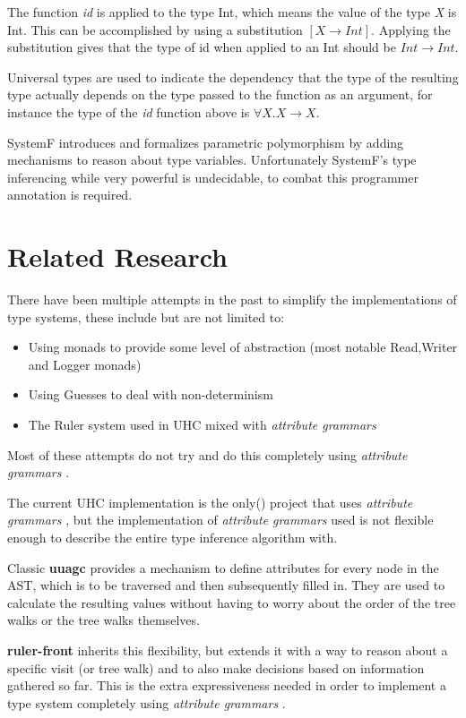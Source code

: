 \documentclass[twoside, titlepage, openright, a4paper]{book}
\newcommand{\ba}[1]{$[#1]$}
\newcommand{\ags}{\emph{attribute grammars }}
\begin{document}
The function \emph{id} is applied to the type Int, which means the value of the type \emph{X} is Int. This can be accomplished by using a substitution \ba{X\rightarrow Int}. Applying the substitution gives that the type of id when applied to an Int should be $Int \rightarrow Int$.

Universal types are used to indicate the dependency that the type of the resulting type actually depends on the type passed to the function as an argument, for instance the type of the \textit{id} function above is $\forall X. X\rightarrow X$.

SystemF introduces and formalizes parametric polymorphism by adding mechanisms to reason about type variables. Unfortunately SystemF's type inferencing while very powerful is undecidable, to combat this programmer annotation is required.

\section{Related Research}
There have been multiple attempts in the past to simplify the implementations of type systems, these include but are not limited to:

\begin{itemize}
\item Using monads\cite{Monads} to provide some level of abstraction (most notable Read,Writer and Logger monads)
\item Using Guesses\cite{Guesses} to deal with non-determinism 
\item The Ruler\cite{Ruler} system used in UHC mixed with \ags
\end{itemize}

Most of these attempts do not try and do this completely using \ags.

The current UHC implementation is the only(\cite{UHC}) project that uses \ags, but the implementation of \ags used is not flexible enough to describe the entire type inference algorithm with.

Classic \textbf{uuagc} provides a mechanism to define attributes for every node in the AST, which is to be traversed and then subsequently filled in. They are used to calculate the resulting values without having to worry about the order of the tree walks or the tree walks themselves.

\textbf{ruler-front} inherits this flexibility, but extends it with a way to reason about a specific visit (or tree walk) and to also make decisions based on information gathered so far. This is the extra expressiveness needed in order to implement a type system completely using \ags.
\end{document}

